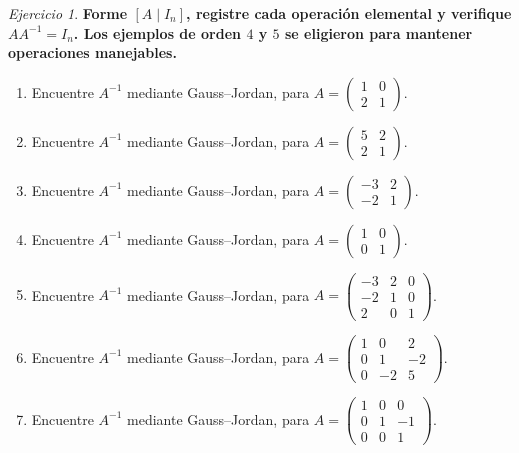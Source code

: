 \documentclass[12pt]{article}
\theoremstyle{remark}
\newtheorem{Ejer}[definicion]{Ejercicio}
\begin{document}
\begin{Ejer}

\textbf{Forme $[A\mid I_n]$, registre cada operación elemental y verifique $AA^{-1}=I_n$. Los ejemplos de orden $4$ y $5$ se eligieron para mantener operaciones manejables.}\par\medskip
\begin{enumerate}[start=127]

\item Encuentre $A^{-1}$ mediante Gauss--Jordan, para $A=\begin{pmatrix}1&0\\2&1\end{pmatrix}$.

\item Encuentre $A^{-1}$ mediante Gauss--Jordan, para $A=\begin{pmatrix}5&2\\2&1\end{pmatrix}$.

\item Encuentre $A^{-1}$ mediante Gauss--Jordan, para $A=\begin{pmatrix}-3&2\\-2&1\end{pmatrix}$.

\item Encuentre $A^{-1}$ mediante Gauss--Jordan, para $A=\begin{pmatrix}1&0\\0&1\end{pmatrix}$.

\item Encuentre $A^{-1}$ mediante Gauss--Jordan, para $A=\begin{pmatrix}-3&2&0\\-2&1&0\\2&0&1\end{pmatrix}$.

\item Encuentre $A^{-1}$ mediante Gauss--Jordan, para $A=\begin{pmatrix}1&0&2\\0&1&-2\\0&-2&5\end{pmatrix}$.

\item Encuentre $A^{-1}$ mediante Gauss--Jordan, para $A=\begin{pmatrix}1&0&0\\0&1&-1\\0&0&1\end{pmatrix}$.


\end{enumerate}
\end{Ejer}
\end{document}
